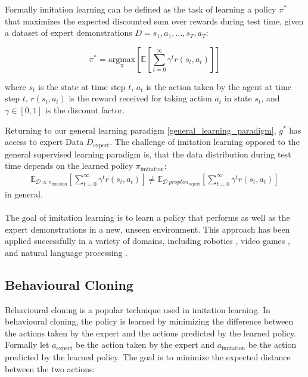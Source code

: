Formally imitation learning can be defined as the task of learning a policy $\pi^*$ that maximizes the expected discounted sum over rewards during test time, given a dataset of expert demonstrations $D = {s_1, a_1, ..., s_T, a_T}$:

\begin{equation}
    \pi^* = \underset{\pi}{\text{argmax}}\left[\mathbb{E} [\sum_{t=0}^{\infty} \gamma^t r(s_t, a_t)]\right]
\end{equation}

where $s_t$ is the state at time step $t$, $a_t$ is the action taken by the agent at time step $t$, $r(s_t, a_t)$ is the reward received for taking action $a_t$ in state $s_t$, and $\gamma \in [0,1]$ is the discount factor.

Returning to our general learning paradigm \ref{general_learning_paradigm}, $g^*$ has access to expert Data $D_{\text{expert}}$. 
The challenge of imitation learning 
opposed to the general supervised learning paradigm is, that the data distribution during test time depends on the learned policy $\pi_{\text{imitation}}$:
\begin{align}
    \mathbb{E}_{\mathcal{D} \propto \pi_{\text{imitaion}}}[\sum_{t=0}^{\infty} \gamma^t r(s_t, a_t)] \neq \mathbb{E}_{\mathcal{D} \ propto \pi_{\text{expert}}}[\sum_{t=0}^{\infty} \gamma^t r(s_t, a_t)]
\end{align}
in general.
\\ \\
The goal of imitation learning is to learn a policy that performs as well as the expert demonstrations in a new, unseen environment. 
This approach has been applied successfully in a variety of domains, including robotics \cite{stepputtis2020languageconditioned}, video games \cite{MUZero}, 
and natural language processing \cite{brown2020language}.

\subsection{Behavioural Cloning}
Behavioural cloning is a popular technique used in imitation learning. 
In behavioural cloning, the policy is learned by minimizing the difference between the actions taken by the expert and the 
actions predicted by the learned policy. Formally let $a_{\text{expert}}$ be the action taken by the expert and $a_{\text{imitation}}$ be the action 
predicted by the learned policy. The goal is to minimize the expected distance between the two actions:

